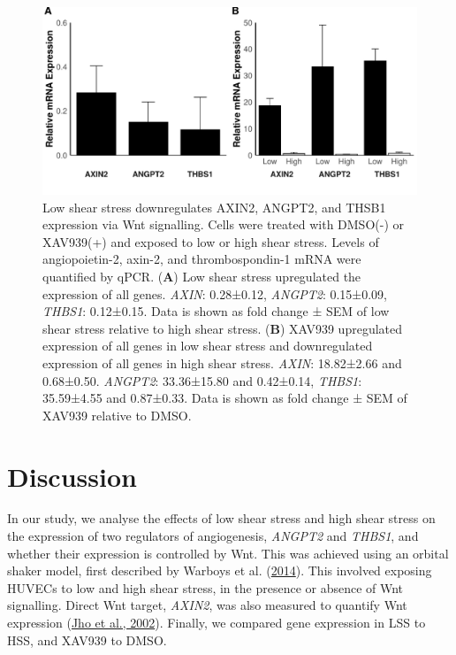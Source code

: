 \documentclass[
  11pt,
]{article}
\begin{document}
\begin{figure}

{\centering \includegraphics{report_files/figure-latex/plots-1} 

}

\caption{Low shear stress downregulates AXIN2, ANGPT2, and THSB1 expression via Wnt signalling. Cells were treated with DMSO(-) or XAV939(+) and exposed to low or high shear stress. Levels of angiopoietin-2, axin-2, and thrombospondin-1 mRNA were quantified by qPCR. (\textbf{A}) Low shear stress upregulated the expression of all genes. \emph{AXIN}: 0.28±0.12, \emph{ANGPT2}: 0.15±0.09, \emph{THBS1}: 0.12±0.15. Data is shown as fold change ± SEM of low shear stress relative to high shear stress. (\textbf{B}) XAV939 upregulated expression of all genes in low shear stress and downregulated expression of all genes in high shear stress. \emph{AXIN}: 18.82±2.66 and 0.68±0.50. \emph{ANGPT2}: 33.36±15.80 and 0.42±0.14, \emph{THBS1}: 35.59±4.55 and 0.87±0.33. Data is shown as fold change ± SEM of XAV939 relative to DMSO.}\label{fig:plots}
\end{figure}

\hypertarget{discussion}{%
\section{Discussion}\label{discussion}}

In our study, we analyse the effects of low shear stress and high shear stress on the expression of two regulators of angiogenesis, \emph{ANGPT2} and \emph{THBS1}, and whether their expression is controlled by Wnt.
This was achieved using an orbital shaker model, first described by Warboys et al. (\protect\hyperlink{ref-Warboys2014}{2014}).
This involved exposing HUVECs to low and high shear stress, in the presence or absence of Wnt signalling.
Direct Wnt target, \emph{AXIN2}, was also measured to quantify Wnt expression (\protect\hyperlink{ref-Jho2002}{Jho et al., 2002}).
Finally, we compared gene expression in LSS to HSS, and XAV939 to DMSO.
\end{document}

